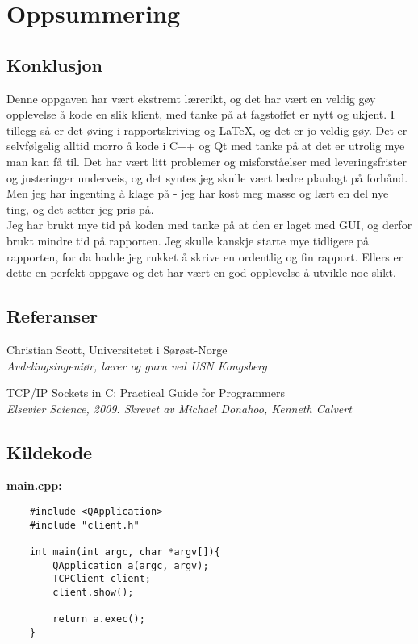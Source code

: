 \section{Oppsummering}
\subsection{Konklusjon}
Denne oppgaven har vært ekstremt lærerikt, og det har vært en veldig gøy opplevelse å kode en slik klient, med tanke på at fagstoffet er nytt og ukjent. I tillegg så er det øving i rapportskriving og LaTeX, og det er jo veldig gøy. Det er selvfølgelig alltid morro å kode i C++ og Qt med tanke på at det er utrolig mye man kan få til. Det har vært litt problemer og misforståelser med leveringsfrister og justeringer underveis, og det syntes jeg skulle vært bedre planlagt på forhånd. Men jeg har ingenting å klage på - jeg har kost meg masse og lært en del nye ting, og det setter jeg pris på.\\

Jeg har brukt mye tid på koden med tanke på at den er laget med GUI, og derfor brukt mindre tid på rapporten. Jeg skulle kanskje starte mye tidligere på rapporten, for da hadde jeg rukket å skrive en ordentlig og fin rapport. Ellers er dette en perfekt oppgave og det har vært en god opplevelse å utvikle noe slikt.

\subsection{Referanser}
\renewcommand{\section}[2]{}
\begin{thebibliography}{50}
		Christian Scott, Universitetet i Sørøst-Norge\\
		\textit{Avdelingsingeniør, lærer og guru ved USN Kongsberg}

		TCP/IP Sockets in C: Practical Guide for Programmers\\
		\textit{Elsevier Science, 2009. Skrevet av Michael Donahoo, Kenneth Calvert}
\end{thebibliography}

\newpage
\subsection{Kildekode}
\textbf{main.cpp:}
\begin{lstlisting}
	#include <QApplication>
	#include "client.h"

	int main(int argc, char *argv[]){
		QApplication a(argc, argv);
		TCPClient client;
		client.show();

		return a.exec();
	}
\end{lstlisting}

